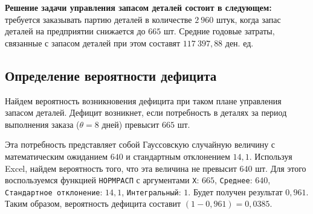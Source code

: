 \textbf{Решение задачи управления запасом деталей состоит
в следующем:} требуется заказывать партию деталей в количестве $2\:960$ штук, когда
запас деталей на предприятии снижается до $665$ шт. Средние годовые затраты,
связанные с запасом деталей при этом составят $117\:397{,}88$ ден. ед.

\subsection{Определение вероятности дефицита}

Найдем вероятность возникновения дефицита при таком плане управления запасом деталей.
Дефицит возникнет, если потребность в деталях за период выполнения
заказа ($\theta = 8$ дней) превысит $665$ шт.

Эта потребность представляет собой Гауссовскую случайную величину с математическим
ожиданием $640$ и стандартным отклонением $14{,}1$.
Используя Excel, найдем вероятность того, что эта величина не превысит $640$ шт.
Для этого воспользуемся функцией \texttt{НОРМРАСП} с аргументами 
\texttt{X}: $665$, \texttt{Среднее}: $640$, \texttt{Стандартное отклонение}: $14{,}1$,
\texttt{Интегральный}: $1$. Будет получен результат $0{,}961$.
Таким образом, вероятность дефицита составит $(1 - 0{,}961) = 0{,}0385$.

\newpage